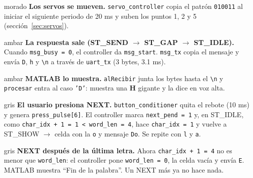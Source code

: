 \documentclass[11pt,a4paper]{article}
\newcommand{\cod}[1]{\texttt{#1}}
\begin{document}
\begin{paso}{morado}
\textbf{Los servos se mueven.} \cod{servo\_controller} copia el patrón
\cod{010011} al iniciar el siguiente periodo de 20 ms y suben los puntos 1, 2 y 5
(sección~\ref{sec:servos}).
\end{paso}

\begin{paso}{ambar}
\textbf{La respuesta sale (ST\_SEND $\to$ ST\_GAP $\to$ ST\_IDLE).}
Cuando \cod{msg\_busy = 0}, el controller da \cod{msg\_start}. \cod{msg\_tx} copia
el mensaje y envía \cod{D}, \cod{h} y \cod{\textbackslash n} a través de
\cod{uart\_tx} (3 bytes, 3.1 ms).
\end{paso}

\begin{paso}{ambar}
\textbf{MATLAB lo muestra.} \cod{alRecibir} junta los bytes hasta el
\cod{\textbackslash n} y \cod{procesar} entra al caso \cod{'D'}: muestra una
\textbf{H} gigante y la dice en voz alta.
\end{paso}

\begin{paso}{gris}
\textbf{El usuario presiona NEXT.} \cod{button\_conditioner} quita el
rebote (10 ms) y genera \cod{press\_pulse[6]}. El controller marca
\cod{next\_pend = 1} y, en ST\_IDLE, como \cod{char\_idx + 1 = 1 < word\_len = 4},
hace \cod{char\_idx = 1} y vuelve a ST\_SHOW $\to$ celda con la \cod{o} y mensaje
\cod{Do}. Se repite con \cod{l} y \cod{a}.
\end{paso}

\begin{paso}{gris}
\textbf{NEXT después de la última letra.} Ahora
\cod{char\_idx + 1 = 4} no es menor que \cod{word\_len}: el controller pone
\cod{word\_len = 0}, la celda vacía y envía \cod{E}. MATLAB muestra ``Fin de la
palabra''. Un NEXT más ya no hace nada.
\end{paso}
\end{document}
